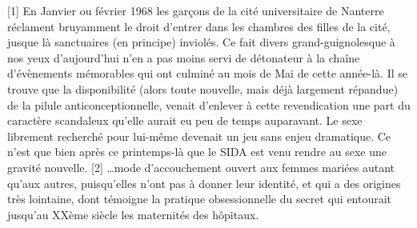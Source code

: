 [1] En Janvier ou février 1968 les garçons de la cité universitaire de Nanterre réclament bruyamment le droit d'entrer dans les chambres des filles de la cité, jusque là sanctuaires (en principe) inviolés. Ce fait divers grand-guignolesque à nos yeux d'aujourd'hui n'en a pas moins servi de détonateur à la chaîne d'évènements mémorables qui ont culminé au mois de Mai de cette année-là. Il se trouve que la disponibilité (alors toute nouvelle, mais déjà largement répandue) de la pilule anticonceptionnelle, venait d'enlever à cette revendication une part du caractère scandaleux qu'elle aurait eu peu de temps auparavant. Le sexe librement recherché pour lui-même devenait un jeu sans enjeu dramatique. Ce n'est que bien après ce printemps-là que le SIDA est venu rendre au sexe une gravité nouvelle.
[2] …mode d'accouchement ouvert aux femmes mariées autant qu'aux autres, puisqu'elles n'ont pas à donner leur identité, et qui a des origines très lointaine, dont témoigne la pratique obsessionnelle du secret qui entourait jusqu'au XXème siècle les maternités des hôpitaux.